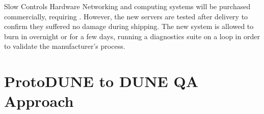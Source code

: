 \begin{comment}
The entire \dword{led} system is checked before installation to ensure
functionality of light emission. Initial testing of the system begins
with measuring the current when low voltage (1~V) is applied, to check
that the resistive \dword{led} failover path is correct. Next, the
forward voltage is measured using nominal forward current to check
that it is within 10\% of the nominal forward voltage drop of the
\dword{led}, that all of the \dwords{led} are illuminated, and that
each \dword{led} is visible over the nominal angular range. If the
\dwords{led} are infrared, a video camera with the IR filter removed
is used for a visual check.


This procedure is then duplicated with the current reversed for
\dwords{led} oriented in the opposite direction. Initial tests are
performed at room temperature and then repeated in \dword{ln}. Color
shifts in the \dwords{led} are expected and will be noted. A checklist
is completed for each \dword{qc} check and filed electronically in the
DUNE logbook.

Room temperature tests are repeated during and immediately after
installation to ensure that the system has not been damaged during
transportation or installation. Functionality checks of the
\dwords{led} are repeated after the cameras are installed in the
cryostat.

too much cisc info relative to others per Tim
\end{comment}

Slow Controls Hardware Networking and computing systems will be
purchased commercially, requiring . However, the new servers
are tested after delivery to confirm they suffered no damage during
shipping. The new system is allowed to burn in overnight or for a few
days, running a diagnostics suite on a loop in order to validate the
manufacturer's  process.


\section{ProtoDUNE to DUNE QA Approach}

